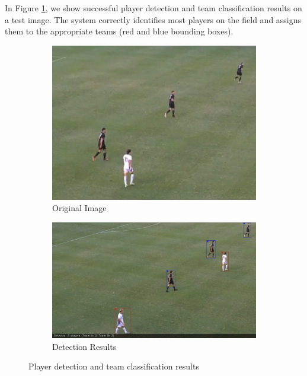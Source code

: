 \documentclass[10pt,twocolumn,letterpaper]{article}
\begin{document}
In Figure \ref{fig:detection_results}, we show successful player detection and team classification results on a test image. The system correctly identifies most players on the field and assigns them to the appropriate teams (red and blue bounding boxes).

\begin{figure}[t]
  \centering
  \begin{subfigure}[b]{0.48\linewidth}
    \centering
    \includegraphics[width=\linewidth]{../data/orginal_image_1.jpeg}
    \caption{Original Image}
  \end{subfigure}
  \begin{subfigure}[b]{0.48\linewidth}
    \centering
    \includegraphics[width=\linewidth]{../edge_detection_steps/results_image_1.jpeg}
    \caption{Detection Results}
  \end{subfigure}
  \caption{Player detection and team classification results}
  \label{fig:detection_results}
\end{figure}
\end{document}
